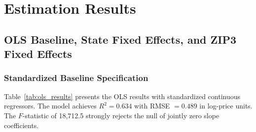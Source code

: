 %
\section{Estimation Results}
\label{sec:results}

\subsection{OLS Baseline, State Fixed Effects, and ZIP3 Fixed Effects}
\label{sec:ols_fe}

\subsubsection{Standardized Baseline Specification}

Table~\ref{tab:ols_results} presents the OLS results with standardized continuous regressors. The model achieves $R^2 = 0.634$ with RMSE $= 0.489$ in log-price units. The $F$-statistic of 18,712.5 strongly rejects the null of jointly zero slope coefficients.

